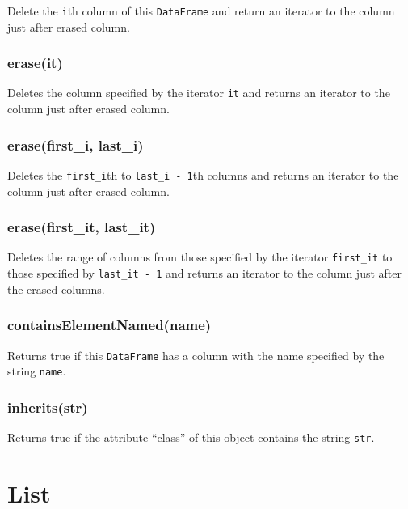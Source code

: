 \documentclass[]{book}
\begin{document}
Delete the \texttt{i}th column of this \texttt{DataFrame} and return an iterator to the column just after erased column.

\hypertarget{eraseit-1}{%
\subsection{erase(it)}\label{eraseit-1}}

Deletes the column specified by the iterator \texttt{it} and returns an iterator to the column just after erased column.

\hypertarget{erasefirst_i-last_i}{%
\subsection{erase(first\_i, last\_i)}\label{erasefirst_i-last_i}}

Deletes the \texttt{first\_i}th to \texttt{last\_i\ -\ 1}th columns and returns an iterator to the column just after erased column.

\hypertarget{erasefirst_it-last_it}{%
\subsection{erase(first\_it, last\_it)}\label{erasefirst_it-last_it}}

Deletes the range of columns from those specified by the iterator \texttt{first\_it} to those specified by \texttt{last\_it\ -\ 1} and returns an iterator to the column just after the erased columns.

\hypertarget{containselementnamedname-1}{%
\subsection{containsElementNamed(name)}\label{containselementnamedname-1}}

Returns true if this \texttt{DataFrame} has a column with the name specified by the string \texttt{name}.

\hypertarget{inheritsstr}{%
\subsection{inherits(str)}\label{inheritsstr}}

Returns true if the attribute ``class'' of this object contains the string \texttt{str}.

\hypertarget{list}{%
\chapter{List}\label{list}}
\end{document}
